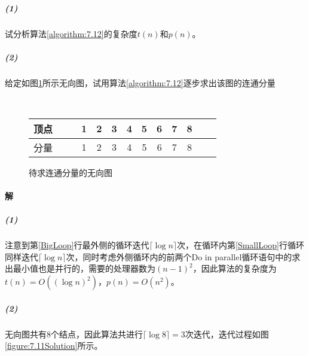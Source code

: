 \documentclass{article}
\begin{document}
\subparagraph{(1)}试分析算法\ref{algorithm:7.12}的复杂度$t(n)$和$p(n)$。
\subparagraph{(2)}给定如图\ref{figure:7.11}所示无向图，试用算法\ref{algorithm:7.12}逐步求出该图的连通分量
\begin{figure}[h]
    \centering
    \\[2.0em]
    \begin{tabular}{c|cccccccccccc}
        顶点 &  &  & 1 & 2 & 3 & 4 & 5 & 6 & 7 & 8 &  & \\ \hline
        分量 &  &  & 1 & 2 & 3 & 4 & 5 & 6 & 7 & 8 &  &
    \end{tabular}
    \caption{待求连通分量的无向图}
    \label{figure:7.11}
\end{figure}

\paragraph{解}
\subparagraph{(1)}
注意到第\ref{BigLoop}行最外侧的循环迭代$\lceil \log{n} \rceil$次，在循环内第\ref{SmallLoop}行循环同样迭代$\lceil \log{n} \rceil$次，同时考虑外侧循环内的前两个Do in parallel循环语句中的求出最小值也是并行的，需要的处理器数为$(n - 1)^2$，因此算法的复杂度为$t(n) = O((\log{n})^2)$，$p(n) = O(n^2)$。

\subparagraph{(2)}
无向图共有8个结点，因此算法共进行$\lceil \log{8} \rceil = 3$次迭代，迭代过程如图\ref{figure:7.11Solution}所示。
\end{document}

